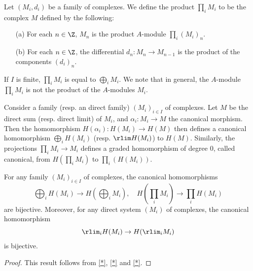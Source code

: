 Let $(M_i,d_i)$ be a family of complexes. We define the product $\prod_iM_i$ to be the complex $M$ defined by the following:
\begin{itemize}
\item[(a)] For each $n\in\Z$, $M_n$ is the product $A$-module $\prod_i(M_i)_n$.
\item[(b)] For each $n\in\Z$, the differential $d_n:M_n\to M_{n-1}$ is the product of the components $(d_i)_n$. 
\end{itemize}
If $I$ is finite, $\prod_iM_i$ is equal to $\bigoplus_iM_i$. We note that in general, the $A$-module $\prod_iM_i$ is not the product of the $A$-modules $M_i$.\par
Consider a family (resp. an direct family) $(M_i)_{i\in I}$ of complexes. Let $M$ be the direct sum (resp. direct limit) of $M_i$, and $\alpha_i:M_i\to M$ the canonical morphism. Then the homomorphism $H(\alpha_i):H(M_i)\to H(M)$ then defines a canonical homomorphism $\bigoplus_iH(M_i)$ (resp. $\rlim H(M_i)$) to $H(M)$. Similarly, the projections $\prod_iM_i\to M_i$ defines a graded homomorphism of degree $0$, called canonical, from $H(\prod_iM_i)$ to $\prod_i(H(M_i))$.
\begin{proposition}\label{module complex homology preserve sum and prod direct limit}
For any family $(M_i)_{i\in I}$ of complexes, the canonical homomorphisms
\[\bigoplus_iH(M_i)\to H(\bigoplus_iM_i),\quad H(\prod_iM_i)\to\prod_iH(M_i)\]
are bijective. Moreover, for any direct system $(M_i)$ of complexes, the canonical homomorphism
\[\rlim_iH(M_i)\to H(\rlim_iM_i)\]
is bijective.
\end{proposition}
\begin{proof}
This result follows from \cref{*}, \cref{*} and \cref{*}.
\end{proof}
